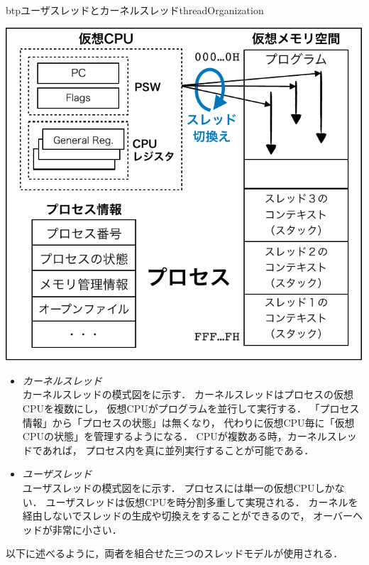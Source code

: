 \begin{myfig}{btp}{ユーザスレッドとカーネルスレッド}{threadOrganization}
\begin{minipage}{0.49\columnwidth}
\begin{center}
      \includegraphics[scale=0.6]{Fig/userThread-crop.pdf}
      \label{fig:userThread}
    \end{center}
  \end{minipage}
\end{myfig}

\begin{itemize}
\item \emph{カーネルスレッド} \\
  カーネルスレッドの模式図をに示す．
  カーネルスレッドはプロセスの仮想CPUを複数にし，
  仮想CPUがプログラムを並行して実行する．
  「プロセス情報」から「プロセスの状態」は無くなり，
  代わりに仮想CPU毎に「仮想CPUの状態」を管理するようになる．
  CPUが複数ある時，カーネルスレッドであれば，
  プロセス内を真に並列実行することが可能である．
\item \emph{ユーザスレッド} \\
  ユーザスレッドの模式図をに示す．
  プロセスには単一の仮想CPUしかない．
  ユーザスレッドは仮想CPUを時分割多重して実現される．
  カーネルを経由しないでスレッドの生成や切換えをすることができるので，
  オーバーヘッドが非常に小さい．
\end{itemize}

以下に述べるように，両者を組合せた三つのスレッドモデルが使用される．

